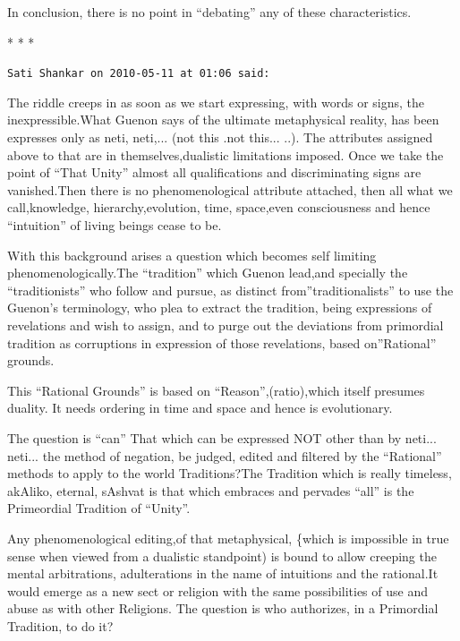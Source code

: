 In conclusion, there is no point in ``debating'' any of these characteristics.



\begin{center}* * *\end{center}

\begin{footnotesize}
\begin{sffamily}
\texttt{Sati Shankar on 2010-05-11 at 01:06 said:}

The riddle creeps in as soon as we start expressing, with words or signs, the inexpressible.What Guenon says of the ultimate metaphysical reality, has been expresses only as neti, neti,... (not this .not this... ..). The attributes assigned above to that are in themselves,dualistic limitations imposed. Once we take the point of ``That Unity'' almost all qualifications and discriminating signs are vanished.Then there is no phenomenological attribute attached, then all what we call,knowledge, hierarchy,evolution, time, space,even consciousness and hence ``intuition'' of living beings cease to be.

With this background arises a question which becomes self limiting phenomenologically.The ``tradition'' which Guenon lead,and specially the ``traditionists'' who follow and pursue, as distinct from''traditionalists'' to use the Guenon's terminology, who plea to extract the tradition, being expressions of revelations and wish to assign, and to purge out the deviations from primordial tradition as corruptions in expression of those revelations, based on''Rational'' grounds.

This ``Rational Grounds'' is based on ``Reason'',(ratio),which itself presumes duality. It needs ordering in time and space and hence is evolutionary.

The question is ``can'' That which can be expressed NOT other than by neti... neti... the method of negation, be judged, edited and filtered by the ``Rational'' methods to apply to the world Traditions?The Tradition which is really timeless, akAliko, eternal, sAshvat is that which embraces and pervades ``all'' is the Primeordial Tradition of ``Unity''.

Any phenomenological editing,of that metaphysical, \{which is impossible in true sense when viewed from a dualistic standpoint) is bound to allow creeping the mental arbitrations, adulterations in the name of intuitions and the rational.It would emerge as a new sect or religion with the same possibilities of use and abuse as with other Religions. The question is who authorizes, in a Primordial Tradition, to do it?


\end{sffamily}
\end{footnotesize}
